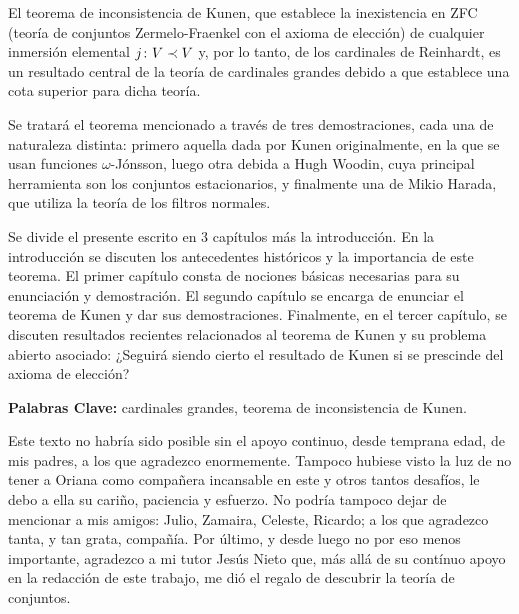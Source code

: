 \documentclass
[
  12pt,
  letterpaper,
  openany,
  oneside,
]{book}
\begin{document}
El teorema de inconsistencia de Kunen, que establece la inexistencia en
ZFC (teoría de conjuntos Zermelo-Fraenkel con el axioma de elección)
de cualquier inmersión elemental $j\colon V\prec V$ y, por lo tanto, de los cardinales
de Reinhardt, es un resultado central de la teoría de cardinales grandes
debido a que establece una cota superior para dicha teoría.

Se tratará el teorema mencionado a través de tres demostraciones, cada una de naturaleza
distinta: primero aquella dada por Kunen originalmente, en la que se usan funciones $\omega$-Jónsson,
luego otra debida a Hugh Woodin, cuya principal herramienta son los conjuntos estacionarios,
y finalmente una de Mikio Harada, que utiliza la teoría de los filtros normales.

Se divide el presente escrito en 3 capítulos más la introducción.
En la introducción se discuten los antecedentes históricos y la importancia
de este teorema.
El primer capítulo consta de nociones básicas necesarias para su enunciación y demostración.
El segundo capítulo se encarga de enunciar el teorema de Kunen y dar sus demostraciones.
Finalmente, en el tercer capítulo, se discuten resultados recientes relacionados al teorema de Kunen
y su problema abierto asociado:
¿Seguirá siendo cierto el resultado de Kunen si se prescinde del axioma de elección?

\vspace{\fill}

\textbf{Palabras Clave:} cardinales grandes, teorema de inconsistencia de Kunen.
\fi
\ifagradecimientos\newpage
{}

Este texto no habría sido posible sin el apoyo continuo,
desde temprana edad, de mis padres, a los que agradezco enormemente.
Tampoco hubiese visto la luz de no tener a Oriana como
compañera incansable en este y otros tantos desafíos, le debo a ella
su cariño, paciencia y esfuerzo.
No podría tampoco dejar de mencionar a mis amigos: Julio, Zamaira,
Celeste, Ricardo; a los que agradezco tanta, y tan grata, compañía.
Por último, y desde luego no por eso menos importante, agradezco a mi
tutor Jesús Nieto que, más allá de su contínuo apoyo en la redacción
de este trabajo, me dió el regalo de descubrir la teoría de conjuntos.
\fi
\iftoc \ToC \fi
\iflistas
{}
\end{document}

